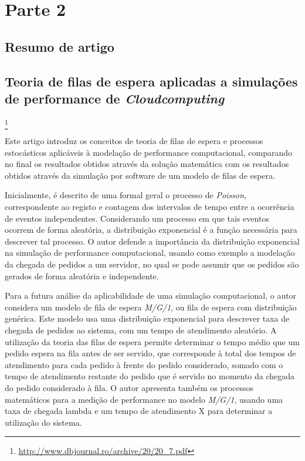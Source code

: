 \chapter{Parte 2}
\label{cap:p2}

\section{Resumo de artigo}

\section{Teoria de filas de espera aplicadas a simulações de performance de
	\emph{Cloudcomputing}}\footnote{\url{http://www.dbjournal.ro/archive/20/20_7.pdf}}



Este artigo introduz os conceitos de teoria de filas de espera e processos
estocásticos aplicáveis à modelação de performance computacional, comparando no
final os resultados obtidos através da solução matemática com os resultados
obtidos através da simulação por software de um modelo de filas de espera.
   
Inicialmente, é descrito de uma formal geral o processo de \emph{Poisson},
correspondente ao registo e contagem dos intervalos de tempo entre a ocorrência
de eventos independentes. Considerando um processo em que tais eventos ocorrem
de forma aleatória, a distribuição exponencial é a função necessária para
descrever tal processo. O autor defende a importância da distribuição
exponencial na simulação de performance computacional, usando como exemplo
a modelação da chegada de pedidos a um servidor, no qual se pode assumir que os
pedidos são gerados de forma aleatória e independente.

Para a futura análise da aplicabilidade de uma simulação computacional, o autor
considera um modelo de fila de espera \emph{M/G/1}, ou fila de espera com distribuição
genérica. Este modelo usa uma distribuição exponencial para descrever taxa de
chegada de pedidos ao sistema, com um tempo de atendimento aleatório.
A utilização da teoria das filas de espera permite determinar o tempo médio que
um pedido espera na fila antes de ser servido, que corresponde à total dos
tempos de atendimento para cada pedido à frente do pedido considerado, somado
com o tempo de atendimento restante do pedido que é servido no momento da
chegada do pedido considerado à fila. O autor apresenta também os processos
matemáticos para a medição de performance no modelo \emph{M/G/1}, usando uma taxa de
chegada lambda e um tempo de atendimento X para determinar a utilização do
sistema. 

